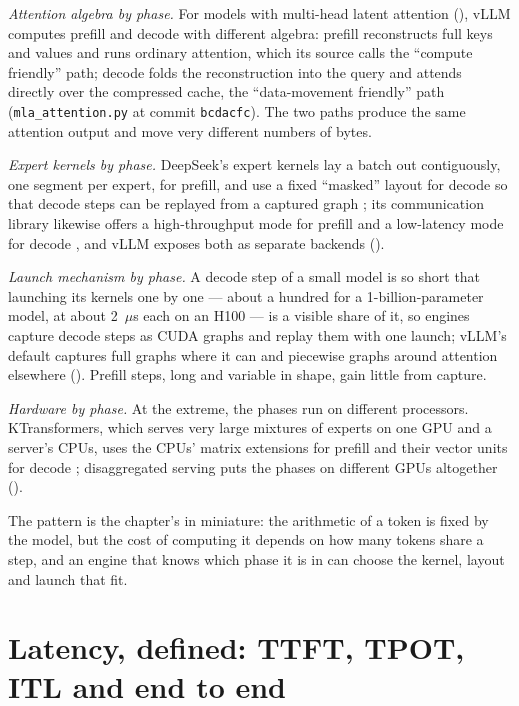 \emph{Attention algebra by phase.} For models with multi-head latent attention
(), vLLM computes prefill and decode with different
algebra: prefill reconstructs full keys and values and runs ordinary attention,
which its source calls the ``compute friendly'' path; decode folds the
reconstruction into the query and attends directly over the compressed cache,
the ``data-movement friendly'' path (\texttt{mla\_attention.py} at commit
\texttt{bcdacfc}). The two paths produce the same attention output and move very
different numbers of bytes.

\emph{Expert kernels by phase.} DeepSeek's expert kernels lay a batch out
contiguously, one segment per expert, for prefill, and use a fixed ``masked''
layout for decode so that decode steps can be replayed from a captured graph
\cite{deepseek2025deepgemm}; its communication library likewise offers a
high-throughput mode for prefill and a low-latency mode for decode
\cite{deepseek2025deepep}, and vLLM exposes both as separate backends
().

\emph{Launch mechanism by phase.} A decode step of a small model is so short
that launching its kernels one by one --- about a hundred for a
1-billion-parameter model, at about 2~$\mu$s each on an H100
\cite{spector2025megakernel} --- is a visible share of it, so engines capture
decode steps as CUDA graphs and replay them with one launch;
vLLM's default captures full graphs where it can and piecewise graphs around
attention elsewhere \cite{vllm2026cudagraphs} ().
Prefill steps, long and variable in shape, gain little from capture.

\emph{Hardware by phase.} At the extreme, the phases run on different
processors. KTransformers, which serves very large mixtures of experts on one
GPU and a server's CPUs, uses the CPUs' matrix extensions for prefill and their
vector units for decode \cite{chen2025ktransformers}; disaggregated serving puts
the phases on different GPUs altogether ().

The pattern is the chapter's in miniature: the arithmetic of a token is fixed
by the model, but the cost of computing it depends on how many tokens share a
step, and an engine that knows which phase it is in can choose the kernel,
layout and launch that fit.

\section{Latency, defined: TTFT, TPOT, ITL and end to end}


